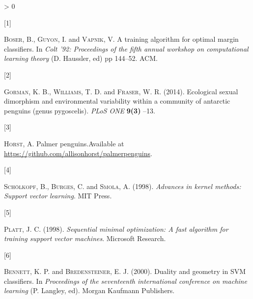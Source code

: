 \documentclass[
]{article}
\newlength{\cslhangindent}
\newlength{\csllabelwidth}
\newenvironment{CSLReferences}[3] %
 {%
  \setlength{\parindent}{0pt}
  \ifodd #1 \everypar{\setlength{\hangindent}{\cslhangindent}}\ignorespaces\fi
  \ifnum #2 > 0
  \setlength{\parskip}{#3\baselineskip}
  \fi
 }%
 {}
\newcommand{\CSLLeftMargin}[1]{\parbox[t]{\maxof{\widthof{#1}}{\csllabelwidth}}{#1}}
\newcommand{\CSLRightInline}[1]{\parbox[t]{\linewidth}{#1}}
\begin{document}
\hypertarget{refs}{}
\begin{CSLReferences}{0}{0}
\leavevmode\hypertarget{ref-vapnik92}{}%
\CSLLeftMargin{{[}1{]} }
\CSLRightInline{\textsc{Boser}, B., \textsc{Guyon}, I. and
\textsc{Vapnik}, V. {A training algorithm for optimal margin
classifiers}. In \emph{Colt '92: Proceedings of the fifth annual
workshop on computational learning theory} (D. Haussler, ed) pp 144--52.
ACM.}

\leavevmode\hypertarget{ref-penguins}{}%
\CSLLeftMargin{{[}2{]} }
\CSLRightInline{\textsc{Gorman}, K. B., \textsc{Williams}, T. D. and
\textsc{Fraser}, W. R. (2014). Ecological sexual dimorphism and
environmental variability within a community of antarctic penguins
(genus pygoscelis). \emph{PLoS ONE} \textbf{9(3)} --13.}

\leavevmode\hypertarget{ref-penguindata}{}%
\CSLLeftMargin{{[}3{]} }
\CSLRightInline{\textsc{Horst}, A. Palmer penguins.Available at
\url{https://github.com/allisonhorst/palmerpenguins}.}

\leavevmode\hypertarget{ref-KernelMethodAdvances}{}%
\CSLLeftMargin{{[}4{]} }
\CSLRightInline{\textsc{Schölkopf}, B., \textsc{Burges}, C. and
\textsc{Smola}, A. (1998). \emph{Advances in kernel methods: Support
vector learning}. MIT Press.}

\leavevmode\hypertarget{ref-plattSMO}{}%
\CSLLeftMargin{{[}5{]} }
\CSLRightInline{\textsc{Platt}, J. C. (1998). \emph{Sequential minimal
optimization: A fast algorithm for training support vector machines}.
Microsoft Research.}

\leavevmode\hypertarget{ref-bennettDuality}{}%
\CSLLeftMargin{{[}6{]} }
\CSLRightInline{\textsc{Bennett}, K. P. and \textsc{Bredensteiner}, E.
J. (2000). Duality and geometry in SVM classifiers. In \emph{Proceedings
of the seventeenth international conference on machine learning} (P.
Langley, ed). Morgan Kaufmann Publishers.}

\end{CSLReferences}
\end{document}
